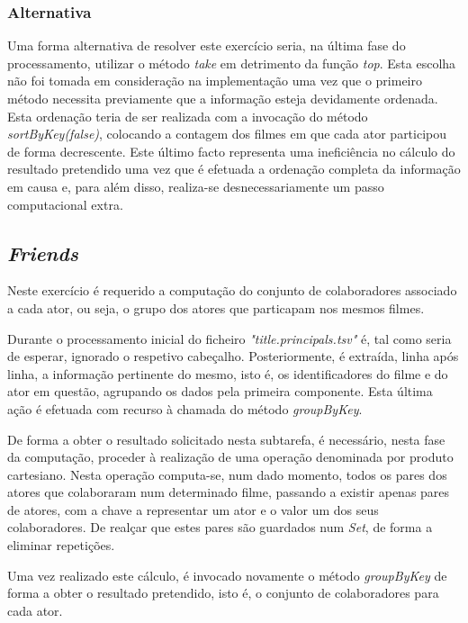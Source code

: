 \documentclass[a4paper]{report}
\begin{document}
            \subsubsection{Alternativa} \label{sssec:Task2-Top10-Alternativa}
                Uma forma alternativa de resolver este exercício seria, na última fase do processamento, utilizar o método \textit{take} em detrimento da função \textit{top}.
                Esta escolha não foi tomada em consideração na implementação uma vez que o primeiro método necessita previamente que a informação esteja devidamente ordenada.
                Esta ordenação teria de ser realizada com a invocação do método \textit{sortByKey(false)}, colocando a contagem dos filmes em que cada ator participou de forma decrescente.
                Este último facto representa uma ineficiência no cálculo do resultado pretendido uma vez que é efetuada a ordenação completa da informação em causa e, para além disso, realiza-se desnecessariamente um passo computacional extra.

        \subsection{\textit{Friends}} \label{subsec:Task2-Friends}
            Neste exercício é requerido a computação do conjunto de colaboradores associado a cada ator, ou seja, o grupo dos atores que particapam nos mesmos filmes.
                
            Durante o processamento inicial do ficheiro \textsl{"title.principals.tsv"} é, tal como seria de esperar, ignorado o respetivo cabeçalho.
            Posteriormente, é extraída, linha após linha, a informação pertinente do mesmo, isto é, os identificadores do filme e do ator em questão, agrupando os dados pela primeira componente. Esta última ação é efetuada com recurso à chamada do método \textit{groupByKey}.

            De forma a obter o resultado solicitado nesta subtarefa, é necessário, nesta fase da computação, proceder à realização de uma operação denominada por produto cartesiano. 
            Nesta operação computa-se, num dado momento, todos os pares dos atores que colaboraram num determinado filme, passando a existir apenas pares de atores, com a chave a representar um ator e o valor um dos seus colaboradores.
            De realçar que estes pares são guardados num \textit{Set}, de forma a eliminar repetições.

            Uma vez realizado este cálculo, é invocado novamente o método \textit{groupByKey} de forma a obter o resultado pretendido, isto é, o conjunto de colaboradores para cada ator.
\end{document}
